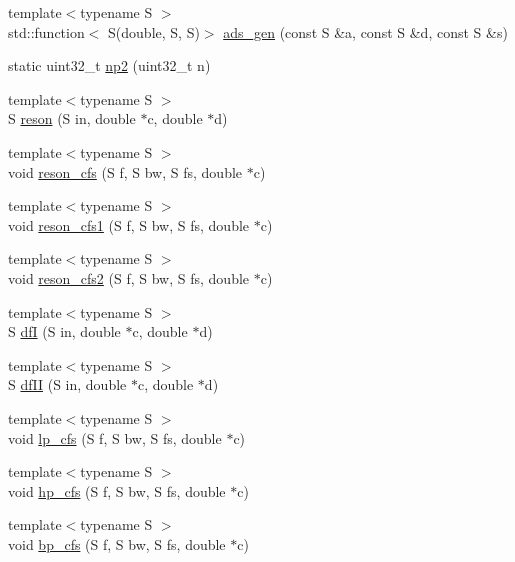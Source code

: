 \begin{DoxyCompactItemize}
\item 
{\footnotesize template$<$typename S $>$ }\\std\+::function$<$ S(double, S, S)$>$ \hyperlink{namespace_aurora_ac7d13365b103aa497998c2bb23ad7f13}{ads\+\_\+gen} (const S \&a, const S \&d, const S \&s)
\item 
static uint32\+\_\+t \hyperlink{namespace_aurora_a49b6f6d92479d80271ced42627154066}{np2} (uint32\+\_\+t n)
\item 
{\footnotesize template$<$typename S $>$ }\\S \hyperlink{namespace_aurora_a5f8647080e611bbb89c4778a9e02e063}{reson} (S in, double $\ast$c, double $\ast$d)
\item 
{\footnotesize template$<$typename S $>$ }\\void \hyperlink{namespace_aurora_a6001679ef5f80dcee8eaa5d90b1f9448}{reson\+\_\+cfs} (S f, S bw, S fs, double $\ast$c)
\item 
{\footnotesize template$<$typename S $>$ }\\void \hyperlink{namespace_aurora_a6a9aa81047a6c7c24bbd6d36077f6726}{reson\+\_\+cfs1} (S f, S bw, S fs, double $\ast$c)
\item 
{\footnotesize template$<$typename S $>$ }\\void \hyperlink{namespace_aurora_a797ddf91c14611eaea1c55f901f40cbf}{reson\+\_\+cfs2} (S f, S bw, S fs, double $\ast$c)
\item 
{\footnotesize template$<$typename S $>$ }\\S \hyperlink{namespace_aurora_ac8ec71dca2761ba7e67669e84faf11dc}{dfI} (S in, double $\ast$c, double $\ast$d)
\item 
{\footnotesize template$<$typename S $>$ }\\S \hyperlink{namespace_aurora_aa413f561e3e6eba365c8268bb6403262}{df\+II} (S in, double $\ast$c, double $\ast$d)
\item 
{\footnotesize template$<$typename S $>$ }\\void \hyperlink{namespace_aurora_af00fa05fba77610297abc0dcb14f2770}{lp\+\_\+cfs} (S f, S bw, S fs, double $\ast$c)
\item 
{\footnotesize template$<$typename S $>$ }\\void \hyperlink{namespace_aurora_a51c342d920dfc9f5d5538ff79f47b0e3}{hp\+\_\+cfs} (S f, S bw, S fs, double $\ast$c)
\item 
{\footnotesize template$<$typename S $>$ }\\void \hyperlink{namespace_aurora_a1d13ad5ed3c1a6494f338436762b67bc}{bp\+\_\+cfs} (S f, S bw, S fs, double $\ast$c)

\end{DoxyCompactItemize}
